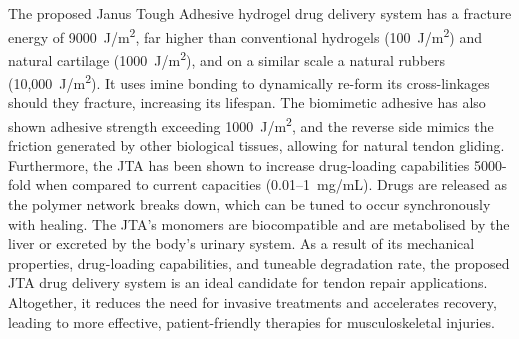 The proposed Janus Tough Adhesive hydrogel drug delivery system has a fracture energy of 9000~J/m\textsuperscript{2}, far higher than conventional hydrogels (100~J/m\textsuperscript{2}) and natural cartilage (1000~J/m\textsuperscript{2}), and on a similar scale a natural rubbers (10,000~J/m\textsuperscript{2}).
It uses imine bonding to dynamically re-form its cross-linkages should they fracture, increasing its lifespan.
The biomimetic adhesive has also shown adhesive strength exceeding 1000~J/m\textsuperscript{2}, and the reverse side mimics the friction generated by other biological tissues, allowing for natural tendon gliding.
Furthermore, the JTA has been shown to increase drug-loading capabilities 5000-fold when compared to current capacities (0.01--1~mg/mL). Drugs are released as the polymer network breaks down, which can be tuned to occur synchronously with healing.
The JTA's monomers are biocompatible and are metabolised by the liver or excreted by the body's urinary system.
As a result of its mechanical properties, drug-loading capabilities, and tuneable degradation rate, the proposed JTA drug delivery system is an ideal candidate for tendon repair applications. Altogether, it reduces the need for invasive treatments and accelerates recovery, leading to more effective, patient-friendly therapies for musculoskeletal injuries.